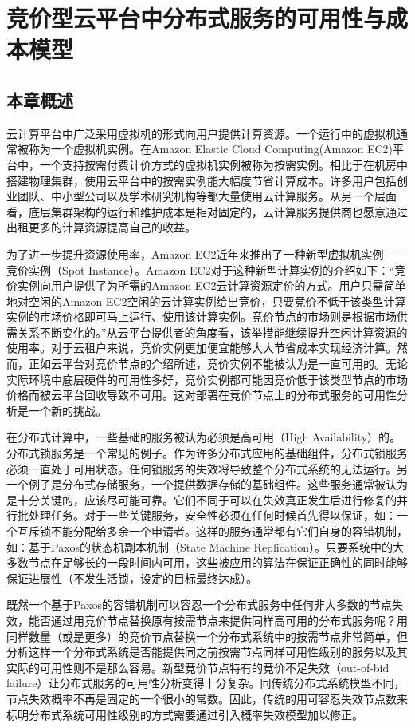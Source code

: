 \chapter{竞价型云平台中分布式服务的可用性与成本模型}
\label{cha:jupiter}

\section{本章概述}
\label{sec:jupiter_intro}
云计算平台中广泛采用虚拟机的形式向用户提供计算资源。一个运行中的虚拟机通常被称为一个虚拟机实例。在Amazon Elastic Cloud Computing(Amazon EC2)平台中，一个支持按需付费计价方式的虚拟机实例被称为按需实例。相比于在机房中搭建物理集群，使用云平台中的按需实例能大幅度节省计算成本。许多用户包括创业团队、中小型公司以及学术研究机构等都大量使用云计算服务。从另一个层面看，底层集群架构的运行和维护成本是相对固定的，云计算服务提供商也愿意通过出租更多的计算资源提高自己的收益。

为了进一步提升资源使用率，Amazon EC2近年来推出了一种新型虚拟机实例－－竞价实例（Spot Instance）。Amazon EC2对于这种新型计算实例的介绍如下：``竞价实例向用户提供了为所需的Amazon EC2云计算资源定价的方式。用户只需简单地对空闲的Amazon EC2空闲的云计算实例给出竞价，只要竞价不低于该类型计算实例的市场价格即可马上运行、使用该计算实例。竞价节点的市场则是根据市场供需关系不断变化的。''从云平台提供者的角度看，该举措能继续提升空闲计算资源的使用率。对于云租户来说，竞价实例更加便宜能够大大节省成本实现经济计算。然而，正如云平台对竞价节点的介绍所述，竞价实例不能被认为是一直可用的。无论实际环境中底层硬件的可用性多好，竞价实例都可能因竞价低于该类型节点的市场价格而被云平台回收导致不可用。这对部署在竞价节点上的分布式服务的可用性分析是一个新的挑战。

在分布式计算中，一些基础的服务被认为必须是高可用（High Availability）的。分布式锁服务是一个常见的例子。作为许多分布式应用的基础组件，分布式锁服务必须一直处于可用状态。任何锁服务的失效将导致整个分布式系统的无法运行。另一个例子是分布式存储服务，一个提供数据存储的基础组件。这些服务通常被认为是十分关键的，应该尽可能可靠。它们不同于可以在失效真正发生后进行修复的并行批处理任务\cite{Liu:2011:CMC:2170444.2170450, 5975137, Yi:2010:RCS:1844768.1845343}。对于一些关键服务，安全性必须在任何时候首先得以保证，如：一个互斥锁不能分配给多余一个申请者。这样的服务通常都有它们自身的容错机制，如：基于Paxos的状态机副本机制（State Machine Replication）。只要系统中的大多数节点在足够长的一段时间内可用，这些被应用的算法在保证正确性的同时能够保证进展性（不发生活锁，设定的目标最终达成）。

既然一个基于Paxos的容错机制可以容忍一个分布式服务中任何非大多数的节点失效，能否通过用竞价节点替换原有按需节点来提供同样高可用的分布式服务呢？用同样数量（或是更多）的竞价节点替换一个分布式系统中的按需节点非常简单，但分析这样一个分布式系统是否能提供同之前按需节点同样可用性级别的服务以及其实际的可用性则不是那么容易。新型竞价节点特有的竞价不足失效（out-of-bid failure）让分布式服务的可用性分析变得十分复杂。同传统分布式系统模型不同，节点失效概率不再是固定的一个很小的常数。因此，传统的用可容忍失效节点数来标明分布式系统可用性级别的方式需要通过引入概率失效模型加以修正。

